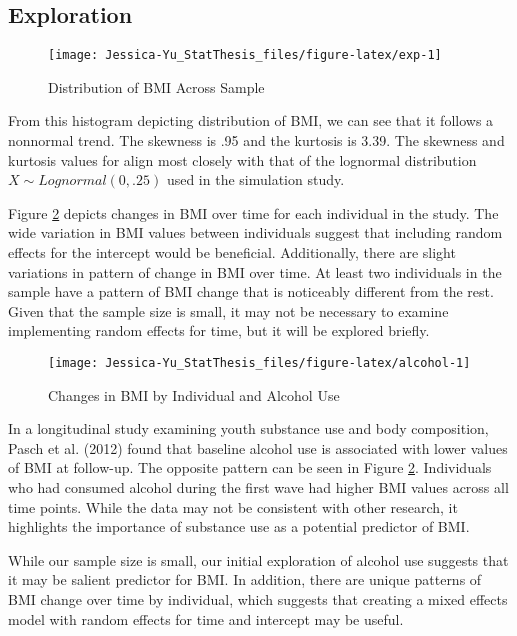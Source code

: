 \documentclass[12pt, twoside]{amherstthesis}
\begin{document}
\hypertarget{exploration}{%
\subsection{Exploration}\label{exploration}}
\begin{figure}

{\centering \texttt{[image: Jessica-Yu\_StatThesis\_files/figure-latex/exp-1]} 

}

\caption{Distribution of BMI Across Sample}\label{fig:exp}
\end{figure}
From this histogram depicting distribution of BMI, we can see that it follows a nonnormal trend. The skewness is .95 and the kurtosis is 3.39. The skewness and kurtosis values for align most closely with that of the lognormal distribution \(X\sim\mathit{Lognormal}(0,.25)\) used in the simulation study.

Figure \ref{fig:alcohol} depicts changes in BMI over time for each individual in the study. The wide variation in BMI values between individuals suggest that including random effects for the intercept would be beneficial. Additionally, there are slight variations in pattern of change in BMI over time. At least two individuals in the sample have a pattern of BMI change that is noticeably different from the rest. Given that the sample size is small, it may not be necessary to examine implementing random effects for time, but it will be explored briefly.
\begin{figure}

{\centering \texttt{[image: Jessica-Yu\_StatThesis\_files/figure-latex/alcohol-1]} 

}

\caption{Changes in BMI by Individual and Alcohol Use}\label{fig:alcohol}
\end{figure}
In a longitudinal study examining youth substance use and body composition, Pasch et al. (2012) found that baseline alcohol use is associated with lower values of BMI at follow-up. The opposite pattern can be seen in Figure \ref{fig:alcohol}. Individuals who had consumed alcohol during the first wave had higher BMI values across all time points. While the data may not be consistent with other research, it highlights the importance of substance use as a potential predictor of BMI.

While our sample size is small, our initial exploration of alcohol use suggests that it may be salient predictor for BMI. In addition, there are unique patterns of BMI change over time by individual, which suggests that creating a mixed effects model with random effects for time and intercept may be useful.
\end{document}
